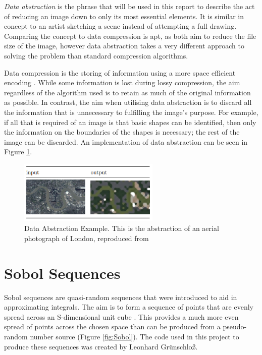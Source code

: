 \textit{Data abstraction} is the phrase that will be used in this report to describe the act of reducing an image down to only its most essential elements. It is similar in concept to an artist sketching a scene instead of attempting a full drawing. Comparing the concept to data compression is apt, as both aim to reduce the file size of the image, however data abstraction takes a very different approach to solving the problem than standard compression algorithms.

Data compression is the storing of information using a more space efficient encoding \cite{compression}. While some information is lost during lossy compression, the aim regardless of the algorithm used is to retain as much of the original information as possible. In contrast, the aim when utilising data abstraction is to discard all the information that is unnecessary to fulfilling the image's purpose. For example, if all that is required of an image is that basic shapes can be identified, then only the information on the boundaries of the shapes is necessary; the rest of the image can be discarded. An implementation of data abstraction can be seen in Figure \ref{fig:abstraction3rdyear}.


\begin{figure}[H]
    \begin{center}
      \includegraphics[width=0.6\textwidth]{Figures/abstraction3rdyear.png}
      \caption[Data Abstraction Example]{Data Abstraction Example. This is the abstraction of an aerial photograph of London, reproduced from \cite{abstraction3rdyear}}
      \label{fig:abstraction3rdyear}
    \end{center}
\end{figure}

\section{Sobol Sequences}
\label{Subsection:sobol}

Sobol sequences are quasi-random sequences that were introduced to aid in approximating integrals. The aim is to form a sequence of points that are evenly spread across an S-dimensional unit cube \cite{joe2008constructing}. This provides a much more even spread of points across the chosen space than can be produced from a pseudo-random number source (Figure \ref{fig:Sobol}). The code used in this project to produce these sequences was created by Leonhard Gr\"unschlo\ss\space \cite{CodeSource}.

